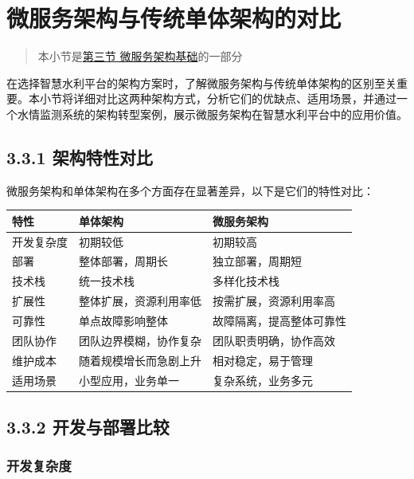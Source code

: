 \section{微服务架构与传统单体架构的对比}\label{ux5faeux670dux52a1ux67b6ux6784ux4e0eux4f20ux7edfux5355ux4f53ux67b6ux6784ux7684ux5bf9ux6bd4}

\begin{quote}
本小节是\href{section03-03.md}{第三节 微服务架构基础}的一部分
\end{quote}

在选择智慧水利平台的架构方案时，了解微服务架构与传统单体架构的区别至关重要。本小节将详细对比这两种架构方式，分析它们的优缺点、适用场景，并通过一个水情监测系统的架构转型案例，展示微服务架构在智慧水利平台中的应用价值。

\subsection{3.3.1
架构特性对比}\label{ux67b6ux6784ux7279ux6027ux5bf9ux6bd4}

微服务架构和单体架构在多个方面存在显著差异，以下是它们的特性对比：

\begin{longtable}[]{@{}lll@{}}
\toprule\noalign{}
特性 & 单体架构 & 微服务架构 \\
\midrule\noalign{}
\endhead
\bottomrule\noalign{}
\endlastfoot
开发复杂度 & 初期较低 & 初期较高 \\
部署 & 整体部署，周期长 & 独立部署，周期短 \\
技术栈 & 统一技术栈 & 多样化技术栈 \\
扩展性 & 整体扩展，资源利用率低 & 按需扩展，资源利用率高 \\
可靠性 & 单点故障影响整体 & 故障隔离，提高整体可靠性 \\
团队协作 & 团队边界模糊，协作复杂 & 团队职责明确，协作高效 \\
维护成本 & 随着规模增长而急剧上升 & 相对稳定，易于管理 \\
适用场景 & 小型应用，业务单一 & 复杂系统，业务多元 \\
\end{longtable}

\subsection{3.3.2
开发与部署比较}\label{ux5f00ux53d1ux4e0eux90e8ux7f72ux6bd4ux8f83}

\subsubsection{开发复杂度}\label{ux5f00ux53d1ux590dux6742ux5ea6}

